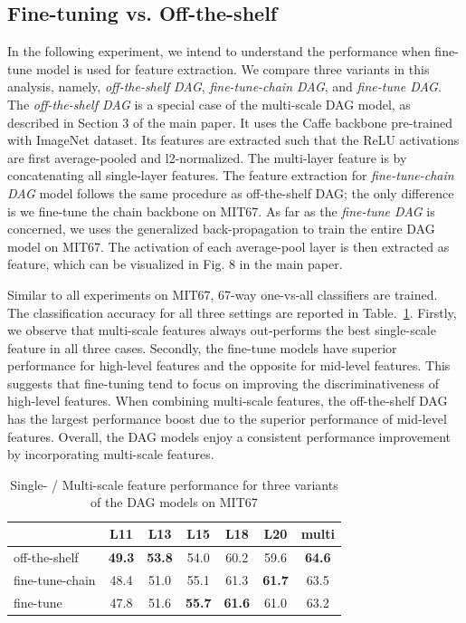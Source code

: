 \documentclass[10pt,twocolumn,letterpaper]{article}
\begin{document}
\subsection{Fine-tuning vs. Off-the-shelf} 

In the following experiment, we intend to understand the performance when fine-tune model is used for feature extraction. We compare three variants in this analysis, namely, \textit{off-the-shelf DAG}, \textit{fine-tune-chain DAG}, and \textit{fine-tune DAG}. The \textit{off-the-shelf DAG} is a special case of the multi-scale DAG model, as described in Section 3 of the main paper. It uses the Caffe backbone pre-trained with ImageNet dataset. Its features are extracted such that the ReLU activations are first average-pooled and l2-normalized. The multi-layer feature is by concatenating all single-layer features. The feature extraction for \textit{fine-tune-chain DAG} model follows the same procedure as off-the-shelf DAG; the only difference is we fine-tune the chain backbone on MIT67. As far as the \textit{fine-tune DAG} is concerned, we uses the generalized back-propagation to train the entire DAG model on MIT67. The activation of each average-pool layer is then extracted as feature, which can be visualized in Fig. 8 in the main paper. 

Similar to all experiments on MIT67, 67-way one-vs-all classifiers are trained. The classification accuracy for all three settings are reported in Table.~\ref{table:ft_ots}. Firstly, we observe that multi-scale features always out-performs the best single-scale feature in all three cases. Secondly, the fine-tune models have superior performance for high-level features and the opposite for mid-level features. This suggests that fine-tuning tend to focus on improving the discriminativeness of high-level features. When combining multi-scale features, the off-the-shelf DAG has the largest performance boost due to the superior performance of mid-level features. Overall, the DAG models enjoy a consistent performance improvement by incorporating multi-scale features. 


\begin{table}[htbp]
\begin{center}
\begin{tabular}{|l|c|c|c|c|c|c|}
\hline
 & L11 & L13 & L15 & L18 & L20 & multi \\
\hline
off-the-shelf & \textbf{49.3} & \textbf{53.8} & 54.0 & 60.2 & 59.6 & \textbf{64.6} \\
fine-tune-chain & 48.4 & 51.0 & 55.1 & 61.3 & \textbf{61.7} & 63.5 \\
fine-tune   & 47.8 & 51.6 & \textbf{55.7} & \textbf{61.6} & 61.0 & 63.2	\\
\hline
\end{tabular}
\end{center}
\caption{Single- / Multi-scale feature performance for three variants of the DAG models on MIT67}
\label{table:ft_ots}
\end{table}
\end{document}
